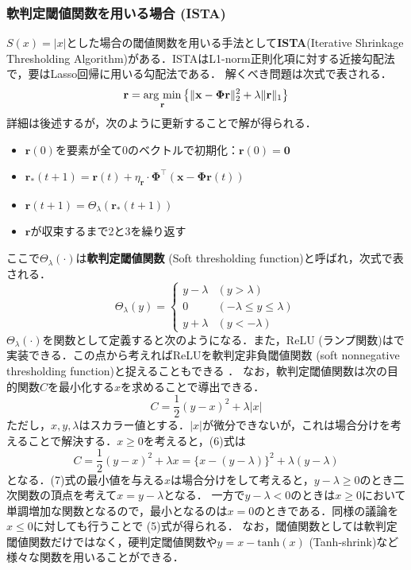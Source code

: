 \subsubsection{軟判定閾値関数を用いる場合 (ISTA)}
$S(x)=|x|$とした場合の閾値関数を用いる手法として\textbf{ISTA}(Iterative Shrinkage Thresholding Algorithm)がある．ISTAはL1-norm正則化項に対する近接勾配法で，要はLasso回帰に用いる勾配法である．
解くべき問題は次式で表される．
\begin{equation}
\mathbf{r} = \mathop{\rm arg~min}\limits_{\mathbf{r}}\left\{\|\mathbf{x}-\mathbf{\Phi}\mathbf{r}\|^2_2+\lambda\|\mathbf{r}\|_1\right\}
\end{equation}
詳細は後述するが，次のように更新することで解が得られる．
\begin{itemize}
\item $\mathbf{r}(0)$を要素が全て0のベクトルで初期化：$\mathbf{r}(0)=\mathbf{0}$
\item $\mathbf{r}_*(t+1)=\mathbf{r}(t)+\eta_\mathbf{r}\cdot \mathbf{\Phi}^\top(\mathbf{x}-\mathbf{\Phi}\mathbf{r}(t))$
\item $\mathbf{r}(t+1) = \Theta_\lambda(\mathbf{r}_*(t+1))$
\item $\mathbf{r}$が収束するまで2と3を繰り返す
\end{itemize}
ここで$\Theta_\lambda(\cdot)$は\textbf{軟判定閾値関数} (Soft thresholding function)と呼ばれ，次式で表される．
\begin{equation}
\Theta_\lambda(y)= 
\begin{cases} 
y-\lambda & (y>\lambda)\\ 
0 & (-\lambda\leq y\leq\lambda)\\ 
 y+\lambda & (y<-\lambda) 
\end{cases}
\end{equation}
$\Theta_\lambda(\cdot)$を関数として定義すると次のようになる．また，ReLU (ランプ関数)はで実装できる．この点から考えればReLUを軟判定非負閾値関数 (soft nonnegative thresholding function)と捉えることもできる \citep{Papyan2018-yr}．
なお，軟判定閾値関数は次の目的関数$C$を最小化する$x$を求めることで導出できる．
\begin{equation}
C=\frac{1}{2}(y-x)^2+\lambda |x|
\end{equation}
ただし，$x, y, \lambda$はスカラー値とする．$|x|$が微分できないが，これは場合分けを考えることで解決する．$x\geq 0$を考えると，(6)式は
\begin{equation}
C=\frac{1}{2}(y-x)^2+\lambda x = \{x-(y-\lambda)\}^2+\lambda(y-\lambda)
\end{equation}
となる．(7)式の最小値を与える$x$は場合分けをして考えると，$y-\lambda\geq0$のとき二次関数の頂点を考えて$x=y-\lambda$となる． 一方で$y-\lambda<0$のときは$x\geq0$において単調増加な関数となるので，最小となるのは$x=0$のときである．同様の議論を$x\leq0$に対しても行うことで (5)式が得られる．
なお，閾値関数としては軟判定閾値関数だけではなく，硬判定閾値関数や$y=x - \text{tanh}(x)$ (Tanh-shrink)など様々な関数を用いることができる．
